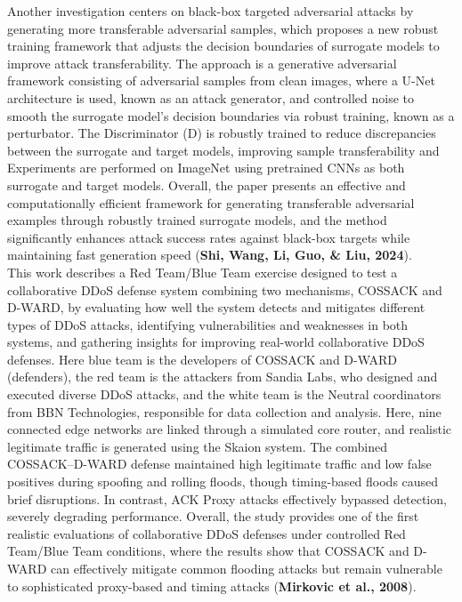 Another investigation centers on black-box targeted adversarial attacks by generating more transferable adversarial samples, which proposes a new robust training framework that adjusts the decision boundaries of surrogate models to improve attack transferability. The approach is a generative adversarial framework consisting of adversarial samples from clean images, where a U-Net architecture is used, known as an attack generator, and controlled noise to smooth the surrogate model’s decision boundaries via robust training, known as a perturbator. The Discriminator (D) is robustly trained to reduce discrepancies between the surrogate and target models, improving sample transferability and Experiments are performed on ImageNet using pretrained CNNs as both surrogate and target models. Overall, the paper presents an effective and computationally efficient framework for generating transferable adversarial examples through robustly trained surrogate models, and the method significantly enhances attack success rates against black-box targets while maintaining fast generation speed (\textbf{Shi, Wang, Li, Guo, \& Liu, 2024})\cite{Shi}.\\

This work describes a Red Team/Blue Team exercise designed to test a collaborative DDoS defense system combining two mechanisms, COSSACK and D-WARD, by evaluating how well the system detects and mitigates different types of DDoS attacks, identifying vulnerabilities and weaknesses in both systems, and gathering insights for improving real-world collaborative DDoS defenses. Here blue team is the developers of COSSACK and D-WARD (defenders), the red team is the attackers from Sandia Labs, who designed and executed diverse DDoS attacks, and the white team is the Neutral coordinators from BBN Technologies, responsible for data collection and analysis. Here, nine connected edge networks are linked through a simulated core router, and realistic legitimate traffic is generated using the Skaion system. The combined COSSACK–D-WARD defense maintained high legitimate traffic and low false positives during spoofing and rolling floods, though timing-based floods caused brief disruptions. In contrast, ACK Proxy attacks effectively bypassed detection, severely degrading performance. Overall, the study provides one of the first realistic evaluations of collaborative DDoS defenses under controlled Red Team/Blue Team conditions, where the results show that COSSACK and D-WARD can effectively mitigate common flooding attacks but remain vulnerable to sophisticated proxy-based and timing attacks (\textbf{Mirkovic et al., 2008})\cite{Mirkovic}.\\



